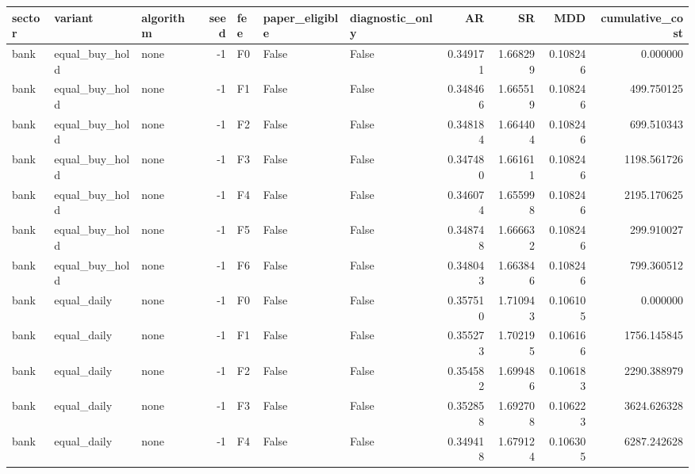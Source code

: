 \begin{tabular}{lllrlllrrrr}
\toprule
    sector &                      variant &     algorithm &  seed & fee &  paper\_eligible &  diagnostic\_only &        AR &        SR &      MDD &  cumulative\_cost \\
\midrule
      bank &               equal\_buy\_hold &          none &    -1 &  F0 &           False &            False &  0.349171 &  1.668299 & 0.108246 &         0.000000 \\
      bank &               equal\_buy\_hold &          none &    -1 &  F1 &           False &            False &  0.348466 &  1.665519 & 0.108246 &       499.750125 \\
      bank &               equal\_buy\_hold &          none &    -1 &  F2 &           False &            False &  0.348184 &  1.664404 & 0.108246 &       699.510343 \\
      bank &               equal\_buy\_hold &          none &    -1 &  F3 &           False &            False &  0.347480 &  1.661611 & 0.108246 &      1198.561726 \\
      bank &               equal\_buy\_hold &          none &    -1 &  F4 &           False &            False &  0.346074 &  1.655998 & 0.108246 &      2195.170625 \\
      bank &               equal\_buy\_hold &          none &    -1 &  F5 &           False &            False &  0.348748 &  1.666632 & 0.108246 &       299.910027 \\
      bank &               equal\_buy\_hold &          none &    -1 &  F6 &           False &            False &  0.348043 &  1.663846 & 0.108246 &       799.360512 \\
      bank &                  equal\_daily &          none &    -1 &  F0 &           False &            False &  0.357510 &  1.710943 & 0.106105 &         0.000000 \\
      bank &                  equal\_daily &          none &    -1 &  F1 &           False &            False &  0.355273 &  1.702195 & 0.106166 &      1756.145845 \\
      bank &                  equal\_daily &          none &    -1 &  F2 &           False &            False &  0.354582 &  1.699486 & 0.106183 &      2290.388979 \\
      bank &                  equal\_daily &          none &    -1 &  F3 &           False &            False &  0.352858 &  1.692708 & 0.106223 &      3624.626328 \\
      bank &                  equal\_daily &          none &    -1 &  F4 &           False &            False &  0.349418 &  1.679124 & 0.106305 &      6287.242628 \\

\end{tabular}
